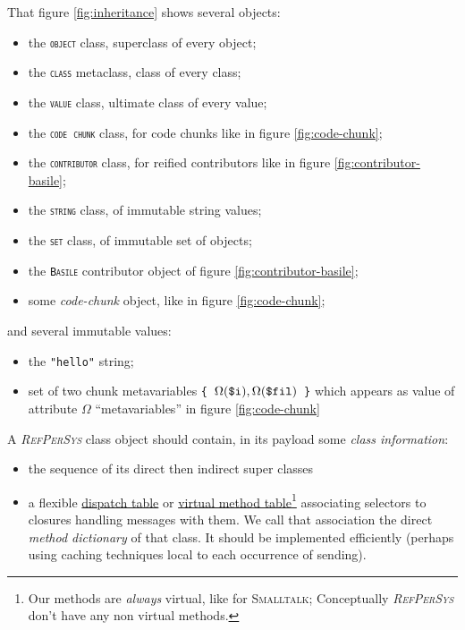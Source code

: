 \documentclass[11pt,a4paper,svgnames]{article}
\newcommand{\RefPerSys}{{\textit{\textsc{RefPerSys}}}}
\begin{document}
That figure \ref{fig:inheritance} shows several objects:
\begin{itemize}
\item the \texttt{\textsc{object}} class, superclass of every object;
\item the \texttt{\textsc{class}} metaclass, class of every class;
\item the \texttt{\textsc{value}} class, ultimate class of every value;
\item the \texttt{\textsc{code chunk}} class, for code chunks like in figure \ref{fig:code-chunk};
\item the \texttt{\textsc{contributor}} class, for reified contributors like in figure \ref{fig:contributor-basile};
\item the \texttt{\textsc{string}} class, of immutable string values;
\item the \texttt{\textsc{set}} class, of immutable set of objects;
\item the \texttt{\textsc{Basile}} contributor object of figure \ref{fig:contributor-basile};
\item some \textit{code-chunk} object,  like in figure \ref{fig:code-chunk};
\end{itemize}
and several immutable values:
\begin{itemize}
\item the \texttt{"hello"} string;
\item set of two chunk metavariables \texttt{\{ $\Omega(\textrm{\texttt{\$i}}), \Omega(\textrm{\texttt{\$fil}}) $ \}} which appears as value of attribute $\Omega$ ``metavariables'' in figure \ref{fig:code-chunk}
\end{itemize}

\medskip

A {\RefPerSys} class object should contain, in its payload some
\emph{class information}:
\begin{itemize}
\item the sequence of its direct then indirect super classes
\item a flexible
  \href{https://en.wikipedia.org/wiki/Dispatch_table}{dispatch table}
  or \href{https://en.wikipedia.org/wiki/Virtual_method_table}{virtual
    method table}\footnote{Our methods are \emph{always} virtual, like
  for \textsc{Smalltalk}; Conceptually {\RefPerSys} don't have any non
  virtual methods.} associating selectors to closures handling
  messages with them. We call that association the direct \emph{method
  dictionary} of that class. It should be implemented efficiently
  (perhaps using caching techniques local to each occurrence of
  sending).
\end{itemize}
\end{document}
